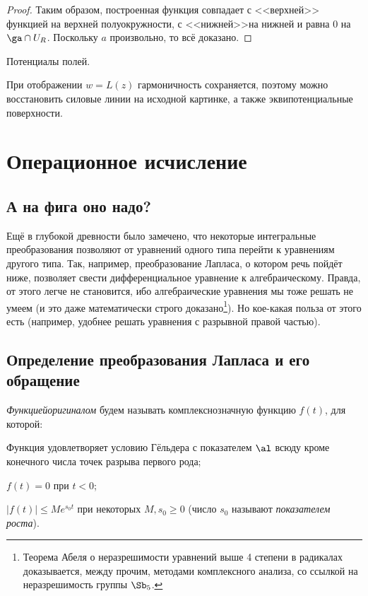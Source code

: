 \documentclass[a4paper]{article}
\begin{document}
\begin{theorem}
\begin{proof}
Таким образом,  построенная функция совпадает с <<верхней>> функцией на верхней
полуокружности,  с <<нижней>>\т на нижней и равна $0$ на $\ga\cap U_R$. Поскольку $a$
произвольно,  то всё доказано.
\end{proof}

\begin{ex}
Потенциалы полей.

При отображении $w=L(z)$ гармоничность сохраняется,  поэтому можно восстановить
силовые линии на исходной картинке, а также эквипотенциальные поверхности.
\end{ex}

\section{Операционное исчисление}

\subsection{А на фига оно надо?}

Ещё в глубокой древности было замечено, что некоторые интегральные преобразования позволяют от уравнений одного типа
перейти к уравнениям другого типа. Так, например, преобразование Лапласа, о котором речь пойдёт ниже, позволяет свести
дифференциальное уравнение к алгебраическому. Правда, от этого легче не становится, ибо алгебраические уравнения мы
тоже решать не умеем (и это даже математически строго доказано\footnote{Теорема Абеля о неразрешимости уравнений
выше 4 степени в радикалах доказывается, между прочим, методами комплексного анализа, со ссылкой на неразрешимость
группы $\Sb_5$.}). Но кое-какая польза от этого есть (например, удобнее решать уравнения с разрывной правой частью).

\subsection{Определение преобразования Лапласа и его обращение}

\begin{df}
\emph{Функцией\д оригиналом} будем называть комплекснозначную функцию $f(t)$, для которой:
\begin{points}{-1}
\item Функция удовлетворяет условию Гёльдера с показателем $\al$ всюду  кроме конечного числа точек разрыва первого рода;
\item $f(t)=0$ при $t < 0$;
\item $|f(t)| \le M e^{s_0 t}$ при некоторых $M,s_0 \ge 0$ (число $s_0$ называют \emph{показателем роста}).
\end{points}
\end{df}


\end{theorem}
\end{document}
